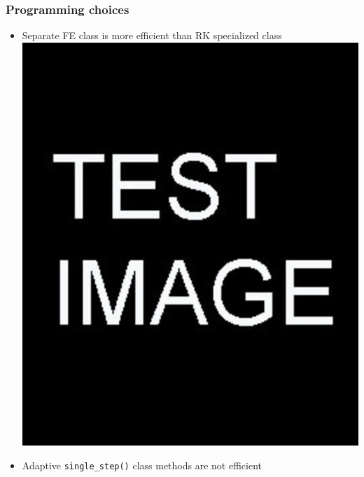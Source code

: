 \documentclass{beamer}
\begin{document}
\begin{frame} %
	\frametitle{Programming choices}
	\begin{itemize}
		\item Separate FE class is more efficient than RK specialized class
		\includegraphics[scale=0.2]{etc/test.jpg}
		\item Adaptive \texttt{single\_step()} class methods are not efficient
	\end{itemize}
\end{frame}
\end{document}
